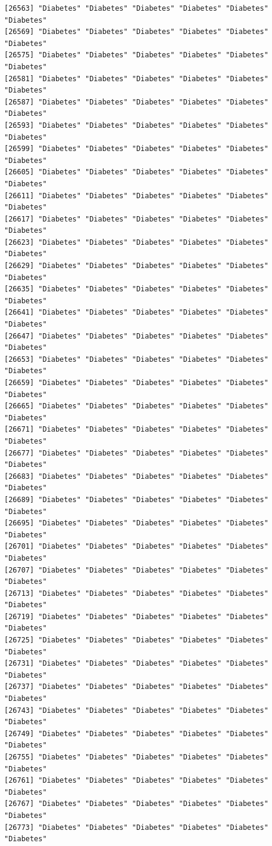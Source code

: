 \documentclass[
  letterpaper,
  DIV=11,
  numbers=noendperiod]{scrartcl}
\begin{document}
\begin{verbatim}
[26563] "Diabetes" "Diabetes" "Diabetes" "Diabetes" "Diabetes" "Diabetes"
[26569] "Diabetes" "Diabetes" "Diabetes" "Diabetes" "Diabetes" "Diabetes"
[26575] "Diabetes" "Diabetes" "Diabetes" "Diabetes" "Diabetes" "Diabetes"
[26581] "Diabetes" "Diabetes" "Diabetes" "Diabetes" "Diabetes" "Diabetes"
[26587] "Diabetes" "Diabetes" "Diabetes" "Diabetes" "Diabetes" "Diabetes"
[26593] "Diabetes" "Diabetes" "Diabetes" "Diabetes" "Diabetes" "Diabetes"
[26599] "Diabetes" "Diabetes" "Diabetes" "Diabetes" "Diabetes" "Diabetes"
[26605] "Diabetes" "Diabetes" "Diabetes" "Diabetes" "Diabetes" "Diabetes"
[26611] "Diabetes" "Diabetes" "Diabetes" "Diabetes" "Diabetes" "Diabetes"
[26617] "Diabetes" "Diabetes" "Diabetes" "Diabetes" "Diabetes" "Diabetes"
[26623] "Diabetes" "Diabetes" "Diabetes" "Diabetes" "Diabetes" "Diabetes"
[26629] "Diabetes" "Diabetes" "Diabetes" "Diabetes" "Diabetes" "Diabetes"
[26635] "Diabetes" "Diabetes" "Diabetes" "Diabetes" "Diabetes" "Diabetes"
[26641] "Diabetes" "Diabetes" "Diabetes" "Diabetes" "Diabetes" "Diabetes"
[26647] "Diabetes" "Diabetes" "Diabetes" "Diabetes" "Diabetes" "Diabetes"
[26653] "Diabetes" "Diabetes" "Diabetes" "Diabetes" "Diabetes" "Diabetes"
[26659] "Diabetes" "Diabetes" "Diabetes" "Diabetes" "Diabetes" "Diabetes"
[26665] "Diabetes" "Diabetes" "Diabetes" "Diabetes" "Diabetes" "Diabetes"
[26671] "Diabetes" "Diabetes" "Diabetes" "Diabetes" "Diabetes" "Diabetes"
[26677] "Diabetes" "Diabetes" "Diabetes" "Diabetes" "Diabetes" "Diabetes"
[26683] "Diabetes" "Diabetes" "Diabetes" "Diabetes" "Diabetes" "Diabetes"
[26689] "Diabetes" "Diabetes" "Diabetes" "Diabetes" "Diabetes" "Diabetes"
[26695] "Diabetes" "Diabetes" "Diabetes" "Diabetes" "Diabetes" "Diabetes"
[26701] "Diabetes" "Diabetes" "Diabetes" "Diabetes" "Diabetes" "Diabetes"
[26707] "Diabetes" "Diabetes" "Diabetes" "Diabetes" "Diabetes" "Diabetes"
[26713] "Diabetes" "Diabetes" "Diabetes" "Diabetes" "Diabetes" "Diabetes"
[26719] "Diabetes" "Diabetes" "Diabetes" "Diabetes" "Diabetes" "Diabetes"
[26725] "Diabetes" "Diabetes" "Diabetes" "Diabetes" "Diabetes" "Diabetes"
[26731] "Diabetes" "Diabetes" "Diabetes" "Diabetes" "Diabetes" "Diabetes"
[26737] "Diabetes" "Diabetes" "Diabetes" "Diabetes" "Diabetes" "Diabetes"
[26743] "Diabetes" "Diabetes" "Diabetes" "Diabetes" "Diabetes" "Diabetes"
[26749] "Diabetes" "Diabetes" "Diabetes" "Diabetes" "Diabetes" "Diabetes"
[26755] "Diabetes" "Diabetes" "Diabetes" "Diabetes" "Diabetes" "Diabetes"
[26761] "Diabetes" "Diabetes" "Diabetes" "Diabetes" "Diabetes" "Diabetes"
[26767] "Diabetes" "Diabetes" "Diabetes" "Diabetes" "Diabetes" "Diabetes"
[26773] "Diabetes" "Diabetes" "Diabetes" "Diabetes" "Diabetes" "Diabetes"

\end{verbatim}
\end{document}
